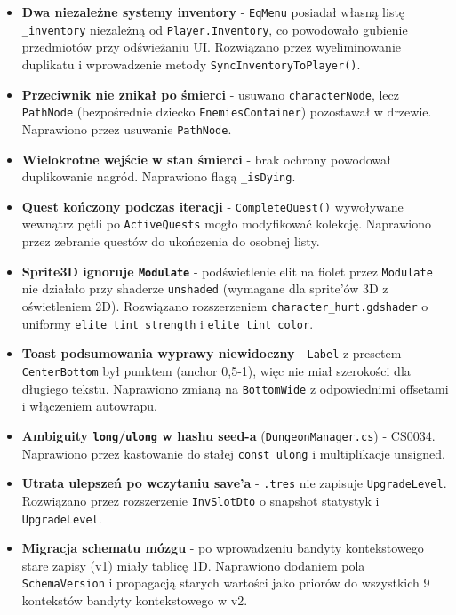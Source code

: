 \begin{itemize}
    \item \textbf{Dwa niezależne systemy inventory} - \texttt{EqMenu} posiadał własną listę \texttt{\_inventory} niezależną od \texttt{Player.Inventory}, co powodowało gubienie przedmiotów przy odświeżaniu UI. Rozwiązano przez wyeliminowanie duplikatu i wprowadzenie metody \texttt{SyncInventoryToPlayer()}.
    \item \textbf{Przeciwnik nie znikał po śmierci} - usuwano \texttt{characterNode}, lecz \texttt{PathNode} (bezpośrednie dziecko \texttt{EnemiesContainer}) pozostawał w drzewie. Naprawiono przez usuwanie \texttt{PathNode}.
    \item \textbf{Wielokrotne wejście w stan śmierci} - brak ochrony powodował duplikowanie nagród. Naprawiono flagą \texttt{\_isDying}.
    \item \textbf{Quest kończony podczas iteracji} - \texttt{CompleteQuest()} wywoływane wewnątrz pętli po \texttt{ActiveQuests} mogło modyfikować kolekcję. Naprawiono przez zebranie questów do ukończenia do osobnej listy.
    \item \textbf{Sprite3D ignoruje \texttt{Modulate}} - podświetlenie elit na fiolet przez \texttt{Modulate} nie działało przy shaderze \texttt{unshaded} (wymagane dla sprite'ów 3D z oświetleniem 2D). Rozwiązano rozszerzeniem \texttt{character\_\allowbreak hurt.\allowbreak gdshader} o uniformy \texttt{elite\_\allowbreak tint\_\allowbreak strength} i \texttt{elite\_\allowbreak tint\_\allowbreak color}.
    \item \textbf{Toast podsumowania wyprawy niewidoczny} - \texttt{Label} z presetem \texttt{CenterBottom} był punktem (anchor 0{,}5-1), więc nie miał szerokości dla długiego tekstu. Naprawiono zmianą na \texttt{BottomWide} z odpowiednimi offsetami i włączeniem autowrapu.
    \item \textbf{Ambiguity \texttt{long}/\texttt{ulong} w hashu seed-a} (\texttt{DungeonManager.cs}) - CS0034. Naprawiono przez kastowanie do stałej \texttt{const ulong} i multiplikacje unsigned.
    \item \textbf{Utrata ulepszeń po wczytaniu save'a} - \texttt{.tres} nie zapisuje \texttt{UpgradeLevel}. Rozwiązano przez rozszerzenie \texttt{InvSlotDto} o snapshot statystyk i \texttt{UpgradeLevel}.
    \item \textbf{Migracja schematu mózgu} - po wprowadzeniu bandyty kontekstowego stare zapisy (v1) miały tablicę 1D. Naprawiono dodaniem pola \texttt{SchemaVersion} i propagacją starych wartości jako priorów do wszystkich 9 kontekstów bandyty kontekstowego w v2.

\end{itemize}
